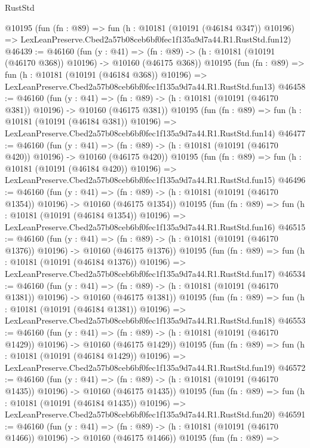 \begin{lexlean}{RustStd}
\begin{coremodule}
    @10195
    (fun (fn : @89) =>
    fun (h : @10181 (@10191 (@46184 @347)) @10196) =>
    LexLeanPreserve.Cbed2a57b08ceb6bf0fec1f135a9d7a44.R1.RustStd.fun12)
@46439 := @46160
    (fun (y : @41) =>
    (fn : @89) -> (h : @10181 (@10191 (@46170 @368)) @10196) -> @10160 (@46175 @368))
    @10195
    (fun (fn : @89) =>
    fun (h : @10181 (@10191 (@46184 @368)) @10196) =>
    LexLeanPreserve.Cbed2a57b08ceb6bf0fec1f135a9d7a44.R1.RustStd.fun13)
@46458 := @46160
    (fun (y : @41) =>
    (fn : @89) -> (h : @10181 (@10191 (@46170 @381)) @10196) -> @10160 (@46175 @381))
    @10195
    (fun (fn : @89) =>
    fun (h : @10181 (@10191 (@46184 @381)) @10196) =>
    LexLeanPreserve.Cbed2a57b08ceb6bf0fec1f135a9d7a44.R1.RustStd.fun14)
@46477 := @46160
    (fun (y : @41) =>
    (fn : @89) -> (h : @10181 (@10191 (@46170 @420)) @10196) -> @10160 (@46175 @420))
    @10195
    (fun (fn : @89) =>
    fun (h : @10181 (@10191 (@46184 @420)) @10196) =>
    LexLeanPreserve.Cbed2a57b08ceb6bf0fec1f135a9d7a44.R1.RustStd.fun15)
@46496 := @46160
    (fun (y : @41) =>
    (fn : @89) -> (h : @10181 (@10191 (@46170 @1354)) @10196) -> @10160 (@46175 @1354))
    @10195
    (fun (fn : @89) =>
    fun (h : @10181 (@10191 (@46184 @1354)) @10196) =>
    LexLeanPreserve.Cbed2a57b08ceb6bf0fec1f135a9d7a44.R1.RustStd.fun16)
@46515 := @46160
    (fun (y : @41) =>
    (fn : @89) -> (h : @10181 (@10191 (@46170 @1376)) @10196) -> @10160 (@46175 @1376))
    @10195
    (fun (fn : @89) =>
    fun (h : @10181 (@10191 (@46184 @1376)) @10196) =>
    LexLeanPreserve.Cbed2a57b08ceb6bf0fec1f135a9d7a44.R1.RustStd.fun17)
@46534 := @46160
    (fun (y : @41) =>
    (fn : @89) -> (h : @10181 (@10191 (@46170 @1381)) @10196) -> @10160 (@46175 @1381))
    @10195
    (fun (fn : @89) =>
    fun (h : @10181 (@10191 (@46184 @1381)) @10196) =>
    LexLeanPreserve.Cbed2a57b08ceb6bf0fec1f135a9d7a44.R1.RustStd.fun18)
@46553 := @46160
    (fun (y : @41) =>
    (fn : @89) -> (h : @10181 (@10191 (@46170 @1429)) @10196) -> @10160 (@46175 @1429))
    @10195
    (fun (fn : @89) =>
    fun (h : @10181 (@10191 (@46184 @1429)) @10196) =>
    LexLeanPreserve.Cbed2a57b08ceb6bf0fec1f135a9d7a44.R1.RustStd.fun19)
@46572 := @46160
    (fun (y : @41) =>
    (fn : @89) -> (h : @10181 (@10191 (@46170 @1435)) @10196) -> @10160 (@46175 @1435))
    @10195
    (fun (fn : @89) =>
    fun (h : @10181 (@10191 (@46184 @1435)) @10196) =>
    LexLeanPreserve.Cbed2a57b08ceb6bf0fec1f135a9d7a44.R1.RustStd.fun20)
@46591 := @46160
    (fun (y : @41) =>
    (fn : @89) -> (h : @10181 (@10191 (@46170 @1466)) @10196) -> @10160 (@46175 @1466))
    @10195
    (fun (fn : @89) =>

\end{coremodule}
\end{lexlean}
